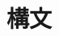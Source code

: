 \documentclass[a4j, dvipdfmx]{jsarticle}
\theoremstyle{definition}
\newenvironment{bprooftree}
                {\leavevmode\hbox\bgroup}
                {\DisplayProof\egroup}
\newcommand{\lnlsequent}[3]{#1 \mid #2 \;\vdash\; #3}
\begin{document}

\section{構文}
\end{document}
